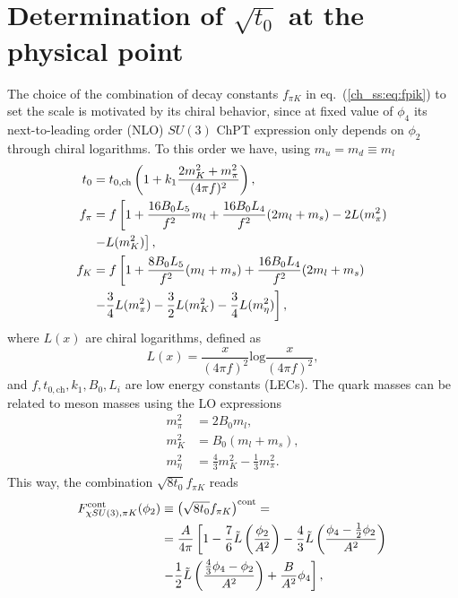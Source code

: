 

\section{Determination of $\sqrt{t_0}$ at the physical point}
\label{ch_ss:sec:Results}

The choice of the combination of decay constants $f_{\pi K}$ in eq.~(\ref{ch_ss:eq:fpik}) to set the scale is motivated by its chiral behavior, since at fixed value of $\phi_4$ its next-to-leading order (NLO) $SU(3)$ ChPT expression only depends on $\phi_2$ through chiral logarithms. To this order we have, using $m_u=m_d\equiv m_l$~\citep{FLAG16,Bar:2013ora}
\begin{align}
\label{ch_ss:eq:t0_chiral}
t_0&=t_{0,\textrm{ch}}\left(1+k_1\frac{2m_K^2+m_{\pi}^2}{(4\pi f)^2}\right), \\
f_{\pi}&=f\left[1+\frac{16B_0L_5}{f^2}m_l+\frac{16B_0L_4}{f^2}(2m_l+m_s)-2L(m_{\pi}^2)\right. \notag \\
&\left.-L(m_K^2)\right], \\
f_K&=f\left[1+\frac{8B_0L_5}{f^2}(m_l+m_s)+\frac{16B_0L_4}{f^2}(2m_l+m_s)\right. \notag \\
&\left.-\frac{3}{4}L(m_{\pi}^2)-\frac{3}{2}L(m_K^2)-\frac{3}{4}L(m_{\eta}^2)\right],
\end{align}
where $L(x)$ are chiral logarithms, defined as
\begin{equation}
L(x)=\frac{x}{(4\pi f)^2}\textrm{log}\frac{x}{(4\pi f)^2},
\end{equation}
and $f,t_{0,\textrm{ch}},k_1,B_0,L_i$ are low energy constants (LECs). The quark masses can be related to meson masses using the LO expressions
\begin{align}
m_{\pi}^2&=2B_0m_l, \\
m_K^2&=B_0(m_l+m_s), \\
m_{\eta}^2&=\frac{4}{3}m_K^2-\frac{1}{3}m_{\pi}^2.
\end{align}
This way, the combination $\sqrt{8t_0}f_{\pi K}$ reads
\begin{align}
\label{ch_ss:eq:SU3ChPT}
F_{\chi SU(3),\pi K}^{\textrm{cont}}(\phi_2)&\equiv\left(\sqrt{8t_0}f_{\pi K}\right)^{\textrm{cont}}= \notag \\
&=\frac{A}{4\pi}\left[1-\frac{7}{6}\tilde{L}\left(\frac{\phi_2}{A^2}\right)-\frac{4}{3}\tilde{L}\left(\frac{\phi_4-\frac{1}{2}\phi_2}{A^2}\right)\right. \notag \\
&\left.-\frac{1}{2}\tilde{L}\left(\frac{\frac{4}{3}\phi_4-\phi_2}{A^2}\right)+\frac{B}{A^2}\phi_4\right],
\end{align}
